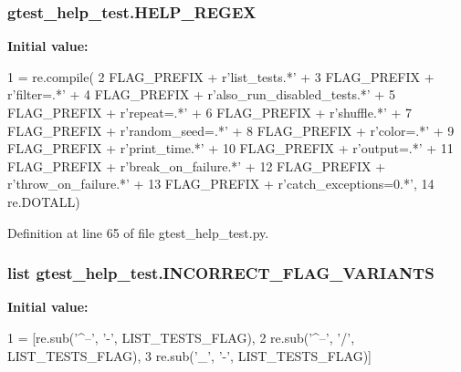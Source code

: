 \subsubsection[{\texorpdfstring{H\+E\+L\+P\+\_\+\+R\+E\+G\+EX}{HELP_REGEX}}]{\setlength{\rightskip}{0pt plus 5cm}gtest\+\_\+help\+\_\+test.\+H\+E\+L\+P\+\_\+\+R\+E\+G\+EX}\hypertarget{namespacegtest__help__test_acaee97106f5b6ad6de66778688d4b906}{}\label{namespacegtest__help__test_acaee97106f5b6ad6de66778688d4b906}
{\bfseries Initial value\+:}
\begin{DoxyCode}
1 = re.compile(
2     FLAG\_PREFIX + \textcolor{stringliteral}{r'list\_tests.*'} +
3     FLAG\_PREFIX + \textcolor{stringliteral}{r'filter=.*'} +
4     FLAG\_PREFIX + \textcolor{stringliteral}{r'also\_run\_disabled\_tests.*'} +
5     FLAG\_PREFIX + \textcolor{stringliteral}{r'repeat=.*'} +
6     FLAG\_PREFIX + \textcolor{stringliteral}{r'shuffle.*'} +
7     FLAG\_PREFIX + \textcolor{stringliteral}{r'random\_seed=.*'} +
8     FLAG\_PREFIX + \textcolor{stringliteral}{r'color=.*'} +
9     FLAG\_PREFIX + \textcolor{stringliteral}{r'print\_time.*'} +
10     FLAG\_PREFIX + \textcolor{stringliteral}{r'output=.*'} +
11     FLAG\_PREFIX + \textcolor{stringliteral}{r'break\_on\_failure.*'} +
12     FLAG\_PREFIX + \textcolor{stringliteral}{r'throw\_on\_failure.*'} +
13     FLAG\_PREFIX + \textcolor{stringliteral}{r'catch\_exceptions=0.*'},
14     re.DOTALL)
\end{DoxyCode}


Definition at line 65 of file gtest\+\_\+help\+\_\+test.\+py.

\subsubsection[{\texorpdfstring{I\+N\+C\+O\+R\+R\+E\+C\+T\+\_\+\+F\+L\+A\+G\+\_\+\+V\+A\+R\+I\+A\+N\+TS}{INCORRECT_FLAG_VARIANTS}}]{\setlength{\rightskip}{0pt plus 5cm}list gtest\+\_\+help\+\_\+test.\+I\+N\+C\+O\+R\+R\+E\+C\+T\+\_\+\+F\+L\+A\+G\+\_\+\+V\+A\+R\+I\+A\+N\+TS}\hypertarget{namespacegtest__help__test_a6f677b9f975f09db7604a5ee9c4821a3}{}\label{namespacegtest__help__test_a6f677b9f975f09db7604a5ee9c4821a3}
{\bfseries Initial value\+:}
\begin{DoxyCode}
1 = [re.sub(\textcolor{stringliteral}{'^--'}, \textcolor{stringliteral}{'-'}, LIST\_TESTS\_FLAG),
2                            re.sub(\textcolor{stringliteral}{'^--'}, \textcolor{stringliteral}{'/'}, LIST\_TESTS\_FLAG),
3                            re.sub(\textcolor{stringliteral}{'\_'}, \textcolor{stringliteral}{'-'}, LIST\_TESTS\_FLAG)]
\end{DoxyCode}



